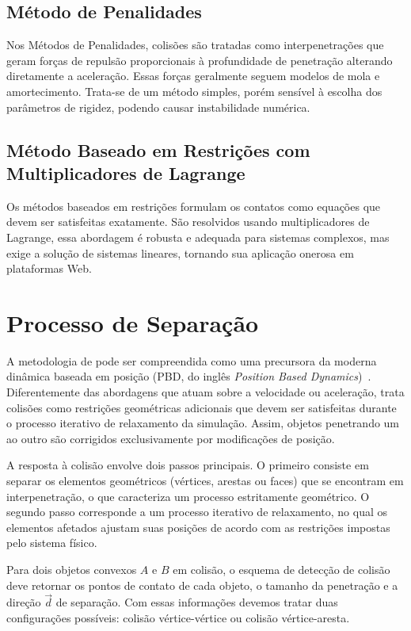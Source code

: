 \subsection*{Método de Penalidades}

Nos Métodos de Penalidades, colisões são tratadas como interpenetrações que geram forças de repulsão proporcionais à profundidade de penetração alterando diretamente a aceleração. Essas forças geralmente seguem modelos de mola e amortecimento. Trata-se de um método simples, porém sensível à escolha dos parâmetros de rigidez, podendo causar instabilidade numérica.

\subsection*{Método Baseado em Restrições com Multiplicadores de Lagrange}

Os métodos baseados em restrições formulam os contatos como equações que devem ser satisfeitas exatamente. São resolvidos usando multiplicadores de Lagrange, essa abordagem é robusta e adequada para sistemas complexos, mas exige a solução de sistemas lineares, tornando sua aplicação onerosa em plataformas Web.

\section{Processo de Separação}

A metodologia de  pode ser compreendida como uma precursora da moderna dinâmica baseada em posição (PBD, do inglês \textit{Position Based Dynamics})~\cite{muller2007position}. Diferentemente das abordagens que atuam sobre a velocidade ou aceleração,  trata colisões como restrições geométricas adicionais que devem ser satisfeitas durante o processo iterativo de relaxamento da simulação. Assim, objetos penetrando um ao outro são corrigidos exclusivamente por modificações de posição.

A resposta à colisão envolve dois passos principais. O primeiro consiste em separar os elementos geométricos (vértices, arestas ou faces) que se encontram em interpenetração, o que caracteriza um processo estritamente geométrico. O segundo passo corresponde a um processo iterativo de relaxamento, no qual os elementos afetados ajustam suas posições de acordo com as restrições impostas pelo sistema físico.

Para dois objetos convexos $A$ e $B$ em colisão, o esquema de detecção de colisão deve retornar os pontos de contato de cada objeto, o tamanho da penetração e a direção $\vec d$ de separação. Com essas informações devemos tratar duas configurações possíveis: colisão vértice-vértice ou colisão vértice-aresta.

